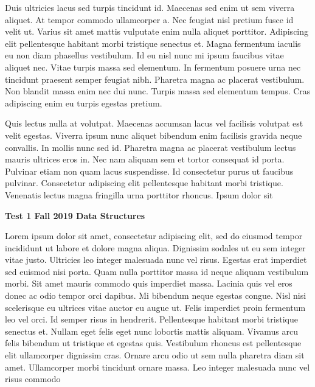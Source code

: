\documentclass[12pt]{article}
\begin{document}
Duis ultricies lacus sed turpis tincidunt id. Maecenas sed enim ut sem viverra aliquet. At tempor commodo ullamcorper a. Nec feugiat nisl pretium fusce id velit ut. Varius sit amet mattis vulputate enim nulla aliquet porttitor. Adipiscing elit pellentesque habitant morbi tristique senectus et. Magna fermentum iaculis eu non diam phasellus vestibulum. Id eu nisl nunc mi ipsum faucibus vitae aliquet nec. Vitae turpis massa sed elementum. In fermentum posuere urna nec tincidunt praesent semper feugiat nibh. Pharetra magna ac placerat vestibulum. Non blandit massa enim nec dui nunc. Turpis massa sed elementum tempus. Cras adipiscing enim eu turpis egestas pretium.

Quis lectus nulla at volutpat. Maecenas accumsan lacus vel facilisis volutpat est velit egestas. Viverra ipsum nunc aliquet bibendum enim facilisis gravida neque convallis. In mollis nunc sed id. Pharetra magna ac placerat vestibulum lectus mauris ultrices eros in. Nec nam aliquam sem et tortor consequat id porta. Pulvinar etiam non quam lacus suspendisse. Id consectetur purus ut faucibus pulvinar. Consectetur adipiscing elit pellentesque habitant morbi tristique. Venenatis lectus magna fringilla urna porttitor rhoncus. Ipsum dolor sit

\newpage

\noindent
{\Large \bf Test 1 \hfill Fall 2019 Data Structures}

\vspace{0.1in}

Lorem ipsum dolor sit amet, consectetur adipiscing elit, sed do eiusmod tempor incididunt ut labore et dolore magna aliqua. Dignissim sodales ut eu sem integer vitae justo. Ultricies leo integer malesuada nunc vel risus. Egestas erat imperdiet sed euismod nisi porta. Quam nulla porttitor massa id neque aliquam vestibulum morbi. Sit amet mauris commodo quis imperdiet massa. Lacinia quis vel eros donec ac odio tempor orci dapibus. Mi bibendum neque egestas congue. Nisl nisi scelerisque eu ultrices vitae auctor eu augue ut. Felis imperdiet proin fermentum leo vel orci. Id semper risus in hendrerit. Pellentesque habitant morbi tristique senectus et. Nullam eget felis eget nunc lobortis mattis aliquam. Vivamus arcu felis bibendum ut tristique et egestas quis. Vestibulum rhoncus est pellentesque elit ullamcorper dignissim cras. Ornare arcu odio ut sem nulla pharetra diam sit amet. Ullamcorper morbi tincidunt ornare massa. Leo integer malesuada nunc vel risus commodo
\end{document}
